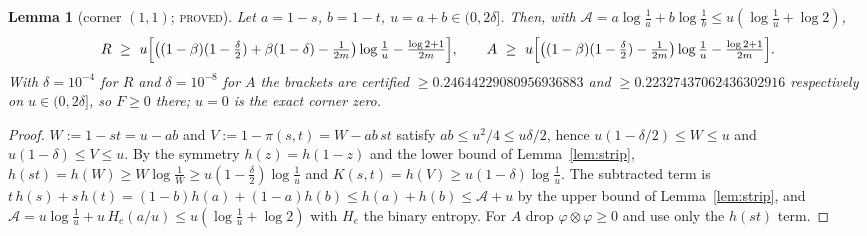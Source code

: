 \documentclass[11pt]{article}
\theoremstyle{plain}
\newtheorem{lemma}[theorem]{Lemma}
\theoremstyle{definition}
\theoremstyle{remark}
\newcommand{\lbl}[1]{\textsc{#1}}
\begin{document}
\begin{lemma}[corner $(1,1)$; \lbl{proved}]\label{lem:corner}
Let $a=1-s$, $b=1-t$, $u=a+b\in(0,2\delta]$.  Then, with $\mathcal
A=a\log\tfrac1a+b\log\tfrac1b\le u(\log\tfrac1u+\log2)$,
\[
  R\ \ge\ u\Bigl[\bigl((1-\beta)(1-\tfrac\delta2)+\beta(1-\delta)-\tfrac1{2m}\bigr)\log\tfrac1u-\tfrac{\log2+1}{2m}\Bigr],
  \qquad
  A\ \ge\ u\Bigl[\bigl((1-\beta)(1-\tfrac\delta2)-\tfrac1{2m}\bigr)\log\tfrac1u-\tfrac{\log2+1}{2m}\Bigr].
\]
With $\delta=10^{-4}$ for $R$ and $\delta=10^{-8}$ for $A$ the brackets are
certified $\ge0.24644229080956936883$ and $\ge0.22327437062436302916$
respectively on $u\in(0,2\delta]$, so $F\ge0$ there; $u=0$ is the exact corner
zero.
\end{lemma}
\begin{proof}
$W:=1-st=u-ab$ and $V:=1-\pi(s,t)=W-ab\,st$ satisfy $ab\le u^2/4\le u\delta/2$,
hence $u(1-\delta/2)\le W\le u$ and $u(1-\delta)\le V\le u$.  By the symmetry
$h(z)=h(1-z)$ and the lower bound of Lemma~\ref{lem:strip},
$h(st)=h(W)\ge W\log\tfrac1W\ge u(1-\tfrac\delta2)\log\tfrac1u$ and
$K(s,t)=h(V)\ge u(1-\delta)\log\tfrac1u$.  The subtracted term is
$t\,h(s)+s\,h(t)=(1-b)h(a)+(1-a)h(b)\le h(a)+h(b)\le\mathcal A+u$ by the upper
bound of Lemma~\ref{lem:strip}, and $\mathcal A=u\log\tfrac1u+u\,H_e(a/u)\le
u(\log\tfrac1u+\log2)$ with $H_e$ the binary entropy.  For $A$ drop
$\varphi\otimes\varphi\ge0$ and use only the $h(st)$ term.
\end{proof}
\end{document}
